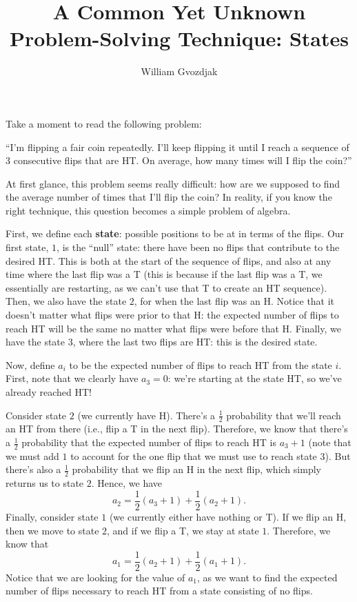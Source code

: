 \documentclass{article}
\title{A Common Yet Unknown Problem-Solving Technique: States}
\author{William Gvozdjak}
\begin{document}
\maketitle
Take a moment to read the following problem:

``I'm flipping a fair coin repeatedly. I'll keep flipping it until I reach a sequence of 3 consecutive flips that are HT. On average, how many times will I flip the coin?''

At first glance, this problem seems really difficult: how are we supposed to find the average number of times that I'll flip the coin? In reality, if you know the right technique, this question becomes a simple problem of algebra.


First, we define each \textbf{state}: possible positions to be at in terms of the flips. Our first state, $1$, is the ``null'' state: there have been no flips that contribute to the desired HT. This is both at the start of the sequence of flips, and also at any time where the last flip was a T (this is because if the last flip was a T, we essentially are restarting, as we can't use that T to create an HT sequence). Then, we also have the state $2$, for when the last flip was an H. Notice that it doesn't matter what flips were prior to that H: the expected number of flips to reach HT will be the same no matter what flips were before that H. Finally, we have the state $3$, where the last two flips are HT: this is the desired state.

Now, define $a_i$ to be the expected number of flips to reach HT from the state $i$. First, note that we clearly have $a_3=0$: we're starting at the state HT, so we've already reached HT!

Consider state $2$ (we currently have H). There's a $\frac{1}{2}$ probability that we'll reach an HT from there (i.e., flip a T in the next flip). Therefore, we know that there's a $\frac{1}{2}$ probability that the expected number of flips to reach HT is $a_3+1$ (note that we must add $1$ to account for the one flip that we must use to reach state $3$). But there's also a $\frac{1}{2}$ probability that we flip an H in the next flip, which simply returns us to state $2$. Hence, we have
\[a_2=\frac{1}{2}(a_3+1)+\frac{1}{2}(a_2+1).\]
Finally, consider state $1$ (we currently either have nothing or T). If we flip an H, then we move to state $2$, and if we flip a T, we stay at state $1$. Therefore, we know that
\[a_1=\frac{1}{2}(a_2+1)+\frac{1}{2}(a_1+1).\]
Notice that we are looking for the value of $a_1$, as we want to find the expected number of flips necessary to reach HT from a state consisting of no flips.
\end{document}
